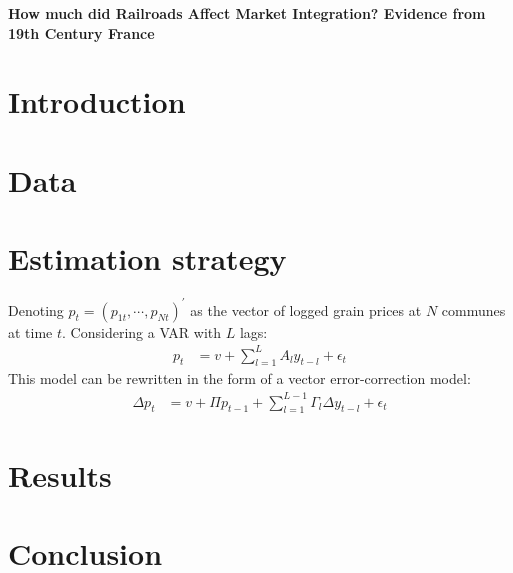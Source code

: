 \documentclass[12pt,twoside]{article}
\begin{document}
\begin{centering}
\textbf{How much did Railroads Affect Market Integration? Evidence from 19th Century France}
\end{centering}

\section{Introduction}

\section{Data}

\section{Estimation strategy}

Denoting $p_t = (p_{1t},\cdots,p_{Nt})^{\prime}$ as the vector of logged grain prices at $N$ communes at time $t$. Considering a VAR with $L$ lags:
\begin{align*}
	p_t &= v + \sum_{l=1}^L A_l y_{t-l} + \epsilon_t
\end{align*}
This model can be rewritten in the form of a vector error-correction model:
\begin{align*}
	\Delta p_t &= v + \Pi p_{t-1} + \sum_{l=1}^{L-1} \Gamma_l \Delta y_{t-l}  + \epsilon_t
\end{align*}



\section{Results}

\section{Conclusion}
\end{document}
